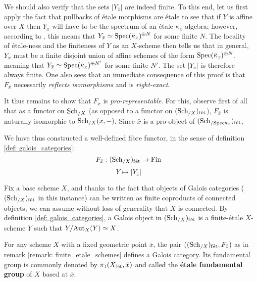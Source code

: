 \begin{remark}
                We should also verify that the sets $|Y_{\bar{x}}|$ are indeed finite. To this end, let us first apply the fact that pullbacks of \'etale morphisms are \'etale to see that if $Y$ is affine over $X$ then $Y_{\bar{x}}$ will have to be the spectrum of an \'etale $\bar{\kappa}_x$-algebra; however, according to \cite[\href{https://stacks.math.columbia.edu/tag/00U3}{Tag 00U3}]{stacks}, this means that $Y_{\bar{x}} \simeq \mathrm{Spec} (\bar{\kappa}_x)^{\oplus N}$ for some finite $N$. The locality of \'etale-ness and the finiteness of $Y$ as an $X$-scheme then tells us that in general, $Y_{\bar{x}}$ must be a finite disjoint union of affine schemes of the form $\mathrm{Spec} (\bar{\kappa}_x)^{\oplus N}$, meaning that $Y_{\bar{x}} \simeq \mathrm{Spec} (\bar{\kappa}_x)^{\oplus N'}$ for some finite $N'$. The set $|Y_{\bar{x}}|$ is therefore always finite. One also sees that an immediate consequence of this proof is that $F_{\bar{x}}$ necessarily \textit{reflects isomorphisms} and is \textit{right-exact}. 
                
                It thus remains to show that $F_{\bar{x}}$ is \textit{pro-representable}. For this, observe first of all that as a functor on $\mathrm{Sch}_{/X}$ (as opposed to a functor on $(\mathrm{Sch}_{/X})_{\mathrm{f\acute{e}t}}$), $F_{\bar{x}}$ is naturally isomorphic to $\mathrm{Sch}_{/X}(\bar{x}, -)$. Since $\bar{x}$ is a pro-object of $(\mathrm{Sch}_{/\mathrm{Spec} \kappa_x})_{\mathrm{f\acute{e}t}}$, 
                
                We have thus constructed a well-defined fibre functor, in the sense of definition \ref{def: galois_categories}:
                    $$F_{\bar{x}}: (\mathrm{Sch}_{/X})_{\mathrm{f\acute{e}t}} \to \mathrm{Fin}$$
                    $$Y \mapsto |Y_{\bar{x}}|$$
            \end{remark}
            \begin{remark} \label{remark: galois_schemes}
                Fix a base scheme $X$, and thanks to the fact that objects of Galois categories ($(\mathrm{Sch}_{/X})_{\mathrm{f\acute{e}t}}$ in this instance) can be written as finite coproducts of connected objects, we can assume without loss of generality that $X$ is connected. By definition \ref{def: galois_categories}, a Galois object in $(\mathrm{Sch}_{/X})_{\mathrm{f\acute{e}t}}$ is a finite-\'etale $X$-scheme $Y$ such that $Y/\mathrm{Aut}_X(Y) \simeq X$. 
            \end{remark}
            \begin{definition} \label{def: etale_fundamental_groups}
                For any scheme $X$ with a fixed geometric point $\bar{x}$, the pair $((\mathrm{Sch}_{/X})_{\mathrm{f\acute{e}t}}, F_{\bar{x}})$ as in remark \ref{remark: finite_etale_schemes} defines a Galois category. Its fundamental group is commonly denoted by $\pi_1(X_{\mathrm{f\acute{e}t}}, \bar{x})$ and called the \textbf{\'etale fundamental group} of $X$ based at $\bar{x}$.
            \end{definition}
